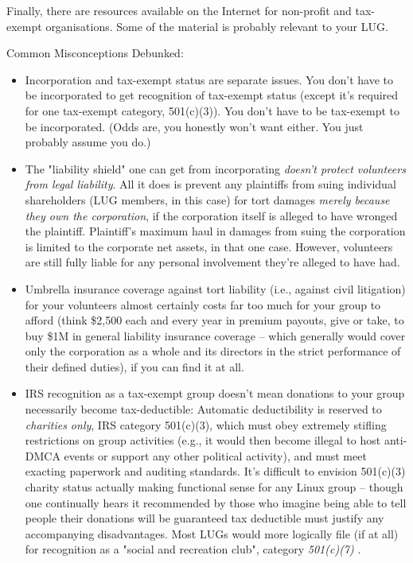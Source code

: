 Finally, there are resources available on the Internet for non-profit
and tax-exempt organisations. Some of the material is probably
relevant to your LUG.

Common Misconceptions Debunked:

\begin{itemize}
\item Incorporation and tax-exempt status are separate issues.  You don't have to be incorporated to get recognition of tax-exempt status (except it's required for one tax-exempt category, 501(c)(3)).  You don't have to be tax-exempt to be incorporated.  (Odds are, you honestly won't want either.  You just probably assume you do.)

\item The "liability shield" one can get from incorporating {\itshape doesn't 
protect volunteers from legal liability\/}.  All it does is prevent any 
plaintiffs from suing individual shareholders (LUG members, in this case) 
for tort damages {\itshape merely because they own the corporation\/}, if the 
corporation itself is alleged to have wronged the plaintiff.  Plaintiff's 
maximum haul in damages from suing the corporation is limited to the 
corporate net assets, in that one case.  However, volunteers are still
fully liable for any personal involvement they're alleged to have had.

\item Umbrella insurance coverage against tort liability (i.e., against civil litigation) for your volunteers almost certainly costs far too much for your group to afford (think \$2,500 each and every year in premium payouts, give or take, to buy \$1M in general liability insurance coverage -- which generally would cover only the corporation as a whole and its directors in the strict performance of their defined duties), if you can find it at all.

\item IRS recognition as a tax-exempt group doesn't mean donations to
your group necessarily become tax-deductible:  Automatic deductibility is
reserved to {\itshape charities only\/}, IRS category 501(c)(3), which must obey 
extremely stifling restrictions on group activities (e.g., it would then 
become illegal to host anti-DMCA events or support any other political
activity), and must meet exacting paperwork and auditing standards.  It's 
difficult to envision 501(c)(3) charity status actually making functional 
sense for any Linux group -- though one continually hears it recommended by
those who imagine being able to tell people their donations will be guaranteed tax deductible must justify any accompanying disadvantages.  Most LUGs would more logically file (if at all) for recognition as a "social and recreation club", category 
\emph{501(c)(7)} \texttt{\aenurl}
.


\end{itemize}
